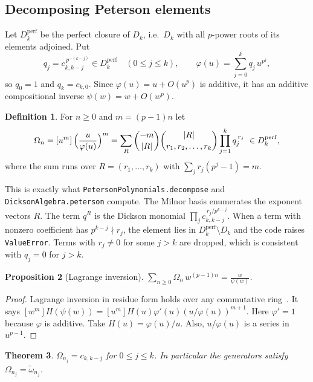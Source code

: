 \documentclass[11pt]{amsart}
\newtheorem{theorem}{Theorem}[section]
\newtheorem{proposition}[theorem]{Proposition}
\theoremstyle{definition}
\newtheorem{definition}[theorem]{Definition}
\theoremstyle{remark}
\newcommand{\Dk}{D_k}
\newcommand{\Dperf}{D_k^{\mathrm{perf}}}
\newcommand{\wt}{\widetilde{\omega}}
\newcommand{\code}[1]{\texttt{#1}}
\newcommand{\coef}[1]{\left[#1\right]}
\begin{document}
\subsection{Decomposing Peterson elements}
Let $\Dperf$ be the perfect closure of $\Dk$, i.e.\ $\Dk$ with all $p$-power
roots of its elements adjoined.  Put
\[
  q_j=c_{k,k-j}^{\,p^{-(k-j)}}\in\Dperf\quad(0\le j\le k),\qquad
  \varphi(u)=\sum_{j=0}^k q_j\,u^{p^j},
\]
so $q_0=1$ and $q_k=c_{k,0}$.  Since $\varphi(u)=u+O(u^p)$ is additive, it has
an additive compositional inverse $\psi(w)=w+O(w^p)$.

\begin{definition}
For $n\ge0$ and $m=(p-1)n$ let
\begin{equation}\label{eq:Omega}
  \Omega_n=\coef{u^m}\Bigl(\frac{u}{\varphi(u)}\Bigr)^{m}
  =\sum_{R}\binom{-m}{|R|}\binom{|R|}{r_1,r_2,\dots,r_k}\prod_{j=1}^k q_j^{\,r_j}\ \in\Dperf ,
\end{equation}
where the sum runs over $R=(r_1,\dots,r_k)$ with $\sum_jr_j(p^j-1)=m$.
\end{definition}

This is exactly what \code{PetersonPolynomials.decompose} and
\code{DicksonAlgebra.peterson} compute.  The Milnor basis enumerates the
exponent vectors $R$.  The term $q^R$ is the Dickson monomial
$\prod_j c_{k,k-j}^{\,r_j/p^{k-j}}$.  When a term with nonzero coefficient
has $p^{k-j}\nmid r_j$, the element lies in $\Dperf\setminus\Dk$ and the code
raises \code{ValueError}.  Terms with $r_j\ne0$ for some $j>k$ are dropped,
which is consistent with $q_j=0$ for $j>k$.

\begin{proposition}[Lagrange inversion]\label{prop:lagrange}
$\displaystyle\sum_{n\ge0}\Omega_n\,w^{(p-1)n}=\frac{w}{\psi(w)}$.
\end{proposition}

\begin{proof}
Lagrange inversion in residue form holds over any commutative
ring~\cite{Gessel}.  It says $\coef{w^m}H(\psi(w))=\coef{u^m}H(u)\varphi'(u)(u/\varphi(u))^{m+1}$.
Here $\varphi'=1$ because $\varphi$ is additive.  Take $H(u)=\varphi(u)/u$.
Also, $u/\varphi(u)$ is a series in $u^{p-1}$.
\end{proof}

\begin{theorem}\label{thm:Aomega}
$\Omega_{n_j}=c_{k,k-j}$ for $0\le j\le k$.  In particular the generators
satisfy $\Omega_{n_j}=\wt_{n_j}$.
\end{theorem}
\end{document}
